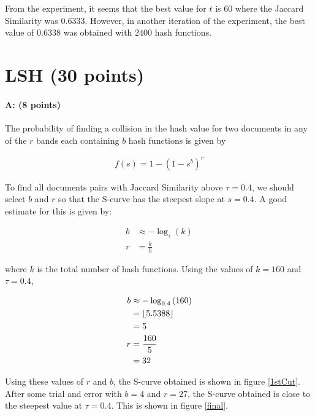 \documentclass[11pt]{article}
\DeclarePairedDelimiter\floor{\lfloor}{\rfloor}
\begin{document}
From the experiment, it seems that the best value for $t$ is $60$ where the Jaccard Similarity was $0.6333$. However, in another iteration of the experiment, the best value of $0.6338$ was obtained with $2400$ hash functions. 

\section{LSH (30 points)}

\paragraph{A: (8 points)} 

The probability of finding a collision in the hash value for two documents in any of the $r$ bands each containing $b$ hash functions is given by

\begin{equation*}
\begin{aligned}
f(s) = 1 - \left ( 1 - s^b \right ) ^ r
\end{aligned}
\end{equation*}

To find all documents pairs with Jaccard Similarity above $\tau = 0.4$, we should select $b$ and $r$ so that the S-curve has the steepest slope at $s=0.4$. A good estimate for this is given by:

\begin{equation*}
\begin{aligned}
b &\approx -\log_{\tau} \left (k \right )\\
r &= \frac{k}{b}
\end{aligned}
\end{equation*}

where $k$ is the total number of hash functions. Using the values of $k=160$ and $\tau=0.4$, 

\begin{equation*}
\begin{aligned}
b &\approx -\log_{0.4} \left (160 \right )\\
&= \floor*{5.5388}\\
&= 5\\
r &= \frac{160}{5}\\
&=32
\end{aligned}
\end{equation*}

Using these values of $r$ and $b$, the S-curve obtained is shown in figure \ref{1stCut}. After some trial and error with $b=4$ and $r=27$, the S-curve obtained is close to the steepest value at $\tau=0.4$. This is shown in figure \ref{final}.
\end{document}
